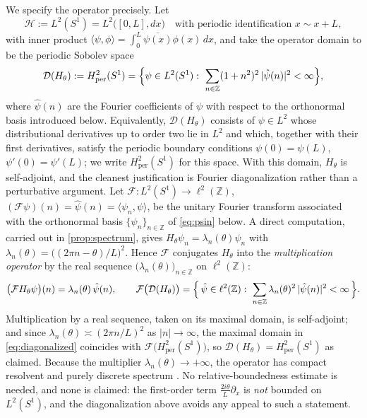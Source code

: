 \documentclass[11pt,reqno]{amsart}
\theoremstyle{plain}
\theoremstyle{definition}
\newcommand{\Zz}{\mathbb{Z}}
\begin{document}
We specify the operator precisely. Let
\begin{equation}\label{eq:Hilbert}
\mathcal{H}:=L^2(S^1)=L^2\bigl([0,L],dx\bigr)
\quad\text{with periodic identification } x\sim x+L,
\end{equation}
with inner product $\langle\psi,\phi\rangle=\int_0^L\overline{\psi(x)}\phi(x)\,dx$, and take the
operator domain to be the periodic Sobolev space
\begin{equation}\label{eq:domain}
\mathcal{D}(H_\theta):=H^2_{\mathrm{per}}(S^1)
=\Bigl\{\psi\in L^2(S^1):\ \sum_{n\in\Zz}(1+n^2)^2\,|\hat\psi(n)|^2<\infty\Bigr\},
\end{equation}
where $\hat\psi(n)$ are the Fourier coefficients of $\psi$ with respect to the orthonormal basis
introduced below. Equivalently, $\mathcal D(H_\theta)$ consists of $\psi\in L^2$ whose
distributional derivatives up to order two lie in $L^2$ and which, together with their first
derivatives, satisfy the periodic boundary conditions $\psi(0)=\psi(L)$, $\psi'(0)=\psi'(L)$;
we write $H^2_{\mathrm{per}}(S^1)$ for this space.
With this domain, $H_\theta$ is self-adjoint, and the cleanest justification is Fourier
diagonalization rather than a perturbative argument. Let $\mathcal F\colon L^2(S^1)\to
\ell^2(\Zz)$, $(\mathcal F\psi)(n)=\hat\psi(n)=\langle\psi_n,\psi\rangle$, be the unitary Fourier
transform associated with the orthonormal basis $\{\psi_n\}_{n\in\Zz}$ of \eqref{eq:psin} below.
A direct computation, carried out in \cref{prop:spectrum}, gives $H_\theta\psi_n=
\lambda_n(\theta)\psi_n$ with $\lambda_n(\theta)=\bigl((2\pi n-\theta)/L\bigr)^2$. Hence
$\mathcal F$ conjugates $H_\theta$ into the \emph{multiplication operator} by the real sequence
$\bigl(\lambda_n(\theta)\bigr)_{n\in\Zz}$ on $\ell^2(\Zz)$:
\begin{equation}\label{eq:diagonalized}
\bigl(\mathcal F H_\theta\psi\bigr)(n)=\lambda_n(\theta)\,\hat\psi(n),
\qquad
\mathcal F\bigl(\mathcal D(H_\theta)\bigr)
=\Bigl\{\,\hat\psi\in\ell^2(\Zz):\ \sum_{n\in\Zz}\lambda_n(\theta)^2\,|\hat\psi(n)|^2<\infty\,\Bigr\}.
\end{equation}
Multiplication by a real sequence, taken on its maximal domain, is self-adjoint; and since
$\lambda_n(\theta)\asymp (2\pi n/L)^2$ as $|n|\to\infty$, the maximal domain in
\eqref{eq:diagonalized} coincides with $\mathcal F\bigl(H^2_{\mathrm{per}}(S^1)\bigr)$, so
$\mathcal D(H_\theta)=H^2_{\mathrm{per}}(S^1)$ as claimed. Because the multiplier
$\lambda_n(\theta)\to+\infty$, the operator has compact resolvent and purely discrete spectrum
\cite{ReedSimonI,ReedSimonIV}. No relative-boundedness estimate is needed, and none is
claimed: the first-order term $\tfrac{2i\theta}{L}\partial_x$ is \emph{not} bounded on $L^2(S^1)$,
and the diagonalization above avoids any appeal to such a statement.
\end{document}

